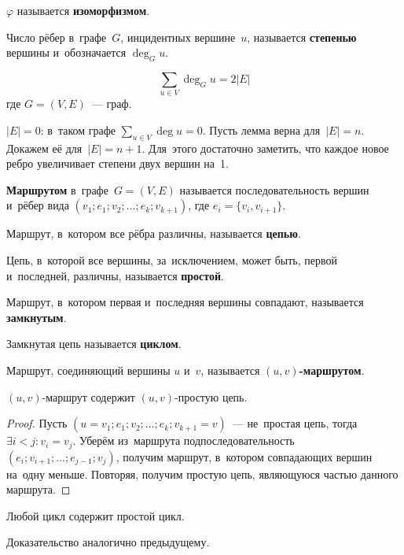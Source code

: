 $\varphi$ называется \textbf{изоморфизмом}.

Число рёбер в~графе~$G$, инцидентных вершине~$u$, называется \textbf{степенью} вершины и~обозначается $\deg_G u$.

\begin{lemma}[о рукопожатиях]
\[ \sum_{u \in V} \deg_G u = 2|E| \]
где $G = (V, E)$~--- граф.
\end{lemma}
\begin{proofmathind}
	\indbase $|E| = 0$: в~таком графе $\displaystyle \sum_{u \in V} \deg u = 0$.
	\newpage
	\indstep Пусть лемма верна для~$|E| = n$.
	Докажем её для~$|E| = n + 1$.
	Для~этого достаточно заметить, что каждое новое ребро увеличивает степени двух вершин на~1. \indend

\end{proofmathind}

\textbf{Маршрутом} в~графе~$G = (V, E)$ называется последовательность вершин и~рёбер вида\newline
$(v_1; e_1; v_2; \ldots; e_k; v_{k+1})$, где $e_i = \{ v_i, v_{i+1} \}$.

Маршрут, в~котором все рёбра различны, называется \textbf{цепью}.

Цепь, в~которой все вершины, за~исключением, может быть, первой и~последней, различны, называется \textbf{простой}.

Маршрут, в~котором первая и~последняя вершины совпадают, называется \textbf{замкнутым}.

Замкнутая цепь называется \textbf{циклом}.

Маршрут, соединяющий вершины $u$ и~$v$, называется \textbf{$(u, v)$\nobreakdash-\hspace{0pt}маршрутом}.

\begin{lemma}
$(u, v)$\nobreakdash-\hspace{0pt}маршрут содержит $(u, v)$\nobreakdash-\hspace{0pt}простую цепь.
\end{lemma}
\begin{proof}
Пусть $(u = v_1; e_1; v_2; \ldots; e_k; v_{k+1} = v)$~--- не~простая цепь, тогда $\exists i < j \colon v_i = v_j$.
Уберём из~маршрута подпоследовательность $(e_i; v_{i+1}; \ldots; e_{j-1}; v_j)$, получим маршрут, в~котором совпадающих вершин на~одну меньше.
Повторяя, получим простую цепь, являющуюся частью данного маршрута.
\end{proof}

\begin{lemma}
Любой цикл содержит простой цикл.
\end{lemma}%
Доказательство аналогично предыдущему.
	
